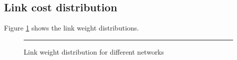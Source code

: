 \documentclass[12pt]{article}
\theoremstyle{definition}
\begin{document}
\subsection{Link cost distribution}
Figure \ref{fig:links} shows the link weight distributions.
\begin{figure}[htb]
  \centering
  \begin{subfigure} {\texttt{[image: links\_bodytrack.png]}} \end{subfigure}
  \begin{subfigure} {\texttt{[image: links\_canneal.png]}} \end{subfigure}
  \begin{subfigure} {\texttt{[image: links\_dedup.png]}} \end{subfigure}
  \begin{subfigure} {\texttt{[image: links\_fluidanimate.png]}} \end{subfigure}
  \begin{subfigure} {\texttt{[image: links\_freqmine.png]}} \end{subfigure}
  \begin{subfigure} {\texttt{[image: links\_swaption.png]}} \end{subfigure}
  \rule{\linewidth}{1pt}
  \caption{Link weight distribution for different networks}
  \label{fig:links}
\end{figure}
\end{document}
